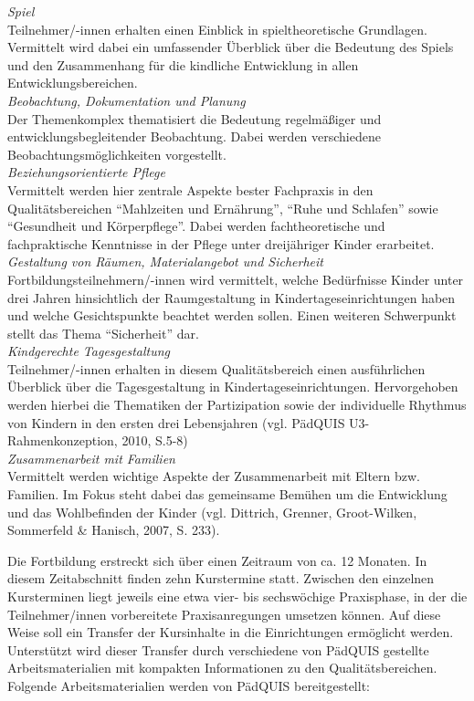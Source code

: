 \documentclass[12pt,a4paper]{article}
\begin{document}
\textit{Spiel}\\
Teilnehmer/-innen erhalten einen Einblick in spieltheoretische Grundlagen. Vermittelt wird dabei ein umfassender Überblick über die Bedeutung des Spiels und den Zusammenhang für die kindliche Entwicklung in allen Entwicklungsbereichen.\\

\textit{Beobachtung, Dokumentation und Planung}\\
Der Themenkomplex thematisiert die Bedeutung regelmäßiger und entwicklungsbegleitender Beobachtung. Dabei werden verschiedene Beo\-bach\-tungs\-möglich\-kei\-ten vorgestellt.\\

\textit{Beziehungsorientierte Pflege}\\
Vermittelt werden hier zentrale Aspekte bester Fachpraxis in den Qua\-li\-täts\-be\-rei\-chen "`Mahlzeiten und Ernährung"', "`Ruhe und Schlafen"' sowie "`Gesundheit und Körperpflege"'. Dabei werden fachtheoretische und fachpraktische Kenntnisse in der Pflege unter dreijähriger Kinder erarbeitet.\\

\textit{Gestaltung von Räumen, Materialangebot und Sicherheit}\\
Fortbildungsteilnehmern/-innen wird vermittelt, welche Bedürfnisse Kin\-der unter drei Jahren hinsichtlich der Raumgestaltung in Kindertageseinrichtungen haben und welche Gesichtspunkte beachtet werden sollen. Einen weiteren Schwerpunkt stellt das Thema "`Sicherheit"' dar.\\

\textit{Kindgerechte Tagesgestaltung}\\
Teilnehmer/-innen erhalten in diesem Qualitätsbereich einen ausführlichen Überblick über die Tagesgestaltung in Kindertageseinrichtungen. Hervorgehoben werden hierbei die Thematiken der Partizipation sowie der individuelle Rhythmus von Kindern in den ersten drei Lebensjahren (vgl. PädQUIS U3-Rahmenkonzeption, 2010, S.5-8)\\

\textit{Zusammenarbeit mit Familien}\\
Vermittelt werden wichtige Aspekte der Zusammenarbeit mit Eltern bzw. Familien. Im Fokus steht dabei das gemeinsame Bemühen um die Entwicklung und das Wohlbefinden der Kinder (vgl. Dittrich, Grenner, Groot-Wilken, Sommerfeld \& Hanisch, 2007, S. 233). 

Die Fortbildung erstreckt sich über einen Zeitraum von ca. 12 Monaten. In diesem Zeitabschnitt finden zehn Kurstermine statt. Zwischen den einzelnen Kursterminen liegt jeweils eine etwa vier- bis sechswöchige Praxisphase, in der die Teilnehmer/innen vorbereitete Praxisanregungen umsetzen können. Auf diese Weise soll ein Transfer der Kursinhalte in die Einrichtungen ermöglicht  werden. Unterstützt wird dieser Transfer durch verschiedene von PädQUIS gestellte Arbeitsmaterialien mit kompakten Informationen zu den Qualitätsbereichen.  
Folgende Arbeitsmaterialien werden von PädQUIS bereitgestellt:
\end{document}
